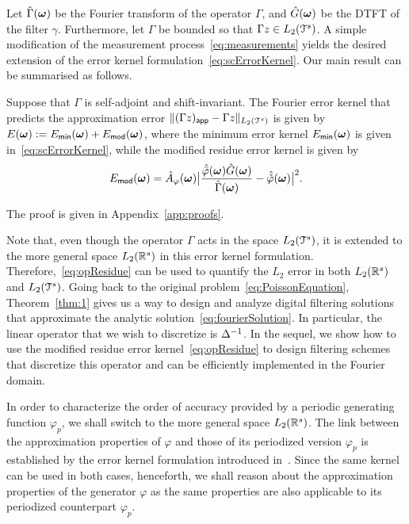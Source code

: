 Let $\hat{\Gamma}(\boldsymbol{\omega})$ be the Fourier transform of the operator $\Gamma$, and $\hat{G}(\boldsymbol{\omega})$ be the DTFT of the filter $\gamma$.
Furthermore, let $\Gamma$ be bounded so that $\Gamma z \in L_2(\mathcal{T}^s)$.
A simple modification of the measurement process~\eqref{eq:measurements} yields the desired extension of the error kernel formulation~\eqref{eq:scErrorKernel}.
Our main result can be summarised as follows.
\begin{thm}
  Suppose that $\Gamma$ is self-adjoint and shift-invariant. 
  The Fourier error kernel that predicts the approximation error
  $\lVert (\Gamma z)_{\mathsf{app}} - \Gamma z \rVert_{L_2(\mathcal{T}^s)}$ is given by $E(\boldsymbol{\omega}) :=
  E_{\mathsf{min}}(\boldsymbol{\omega}) + E_{\mathsf{mod}}(\boldsymbol{\omega})$,
  where the minimum error kernel $E_{\mathsf{min}}(\boldsymbol{\omega})$ is
  given in~\eqref{eq:scErrorKernel}, while the modified residue
  error kernel is given by
  \begin{equation}
    E_{\mathsf{mod}}(\vect{\omega}) = 
    \ft{A}_{\varphi}(\vect{\omega})
    \abs{
      \frac{\ft{\analysis{\varphi}}(\vect{\omega}) \ft{G}(\vect{\omega})}
      {\ft{\Gamma}(\vect{\omega})}
      - 
      \ft{\dual{\varphi}}(\vect{\omega})}^2.
    \label{eq:opResidue}
  \end{equation}
\label{thm:1}
\end{thm}
The proof is given in Appendix~\ref{app:proofs}.

Note that, even though the operator $\Gamma$ acts in the space $L_2(\mathcal{T}^s)$, it is extended to the more general space $L_2(\mathbb{R}^s)$ in this error kernel formulation.
Therefore,~\eqref{eq:opResidue} can be used to quantify the $L_2$ error in both $L_2(\mathbb{R}^s)$ and $L_2(\mathcal{T}^s)$. 
Going back to the original problem~\eqref{eq:PoissonEquation}, Theorem~\ref{thm:1} gives us a way to design and analyze digital filtering solutions that approximate the analytic
solution~\eqref{eq:fourierSolution}. 
In particular, the linear operator that we wish to discretize is $\mathop{\Delta^{-1}}$. In the sequel, we show how to use the modified residue error kernel~\eqref{eq:opResidue} to design filtering schemes that discretize this operator and can be efficiently implemented in the
Fourier domain.

In order to characterize the order of accuracy provided by a periodic generating function $\varphi_p$, we shall switch to the more general space $L_2(\mathbb{R}^s)$.  The link between the approximation properties of $\varphi$ and those of its periodized version $\varphi_p$ is
established by the error kernel formulation introduced in~. Since the same kernel can be used in both cases, henceforth, we shall reason about the approximation properties of the generator $\varphi$ as the same properties are also
applicable to its periodized counterpart $\varphi_p$.

